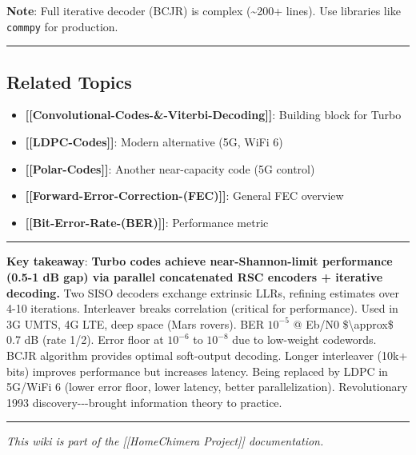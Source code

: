 \textbf{Note}: Full iterative decoder (BCJR) is complex
(\textasciitilde200+ lines). Use libraries like \texttt{commpy} for
production.

\begin{center}\rule{0.5\linewidth}{0.5pt}\end{center}

\subsection{Related Topics}\label{related-topics}

\begin{itemize}
\tightlist
\item
  \textbf{{[}{[}Convolutional-Codes-\&-Viterbi-Decoding{]}{]}}: Building
  block for Turbo
\item
  \textbf{{[}{[}LDPC-Codes{]}{]}}: Modern alternative (5G, WiFi 6)
\item
  \textbf{{[}{[}Polar-Codes{]}{]}}: Another near-capacity code (5G
  control)
\item
  \textbf{{[}{[}Forward-Error-Correction-(FEC){]}{]}}: General FEC
  overview
\item
  \textbf{{[}{[}Bit-Error-Rate-(BER){]}{]}}: Performance metric
\end{itemize}

\begin{center}\rule{0.5\linewidth}{0.5pt}\end{center}

\textbf{Key takeaway}: \textbf{Turbo codes achieve near-Shannon-limit
performance (0.5-1 dB gap) via parallel concatenated RSC encoders +
iterative decoding.} Two SISO decoders exchange extrinsic LLRs, refining
estimates over 4-10 iterations. Interleaver breaks correlation (critical
for performance). Used in 3G UMTS, 4G LTE, deep space (Mars rovers). BER
\(10^{-5}\) @ Eb/N0 \$\textbackslash approx\$ 0.7 dB (rate 1/2). Error
floor at \(10^{-6}\) to \(10^{-8}\) due to low-weight codewords. BCJR
algorithm provides optimal soft-output decoding. Longer interleaver
(10k+ bits) improves performance but increases latency. Being replaced
by LDPC in 5G/WiFi 6 (lower error floor, lower latency, better
parallelization). Revolutionary 1993 discovery-\/-\/-brought information
theory to practice.

\begin{center}\rule{0.5\linewidth}{0.5pt}\end{center}

\emph{This wiki is part of the {[}{[}Home\textbar Chimera Project{]}{]}
documentation.}
